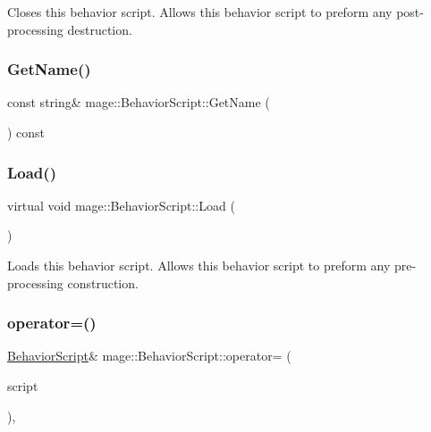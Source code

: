 Closes this behavior script. Allows this behavior script to preform any post-\/processing destruction. \hypertarget{classmage_1_1_behavior_script_a06179af26e24991b5083a5b1d603bc93}{}\label{classmage_1_1_behavior_script_a06179af26e24991b5083a5b1d603bc93} 
\subsubsection{\texorpdfstring{Get\+Name()}{GetName()}}
{\footnotesize\ttfamily const string\& mage\+::\+Behavior\+Script\+::\+Get\+Name (\begin{DoxyParamCaption}{ }\end{DoxyParamCaption}) const}

\hypertarget{classmage_1_1_behavior_script_a9b2954891ee98dcef926b1db42674ce3}{}\label{classmage_1_1_behavior_script_a9b2954891ee98dcef926b1db42674ce3} 
\subsubsection{\texorpdfstring{Load()}{Load()}}
{\footnotesize\ttfamily virtual void mage\+::\+Behavior\+Script\+::\+Load (\begin{DoxyParamCaption}{ }\end{DoxyParamCaption})\hspace{0.3cm}{\ttfamily [virtual]}}

Loads this behavior script. Allows this behavior script to preform any pre-\/processing construction. \hypertarget{classmage_1_1_behavior_script_a0b3327ebf7009e668a7022d254cb1d51}{}\label{classmage_1_1_behavior_script_a0b3327ebf7009e668a7022d254cb1d51} 
\subsubsection{\texorpdfstring{operator=()}{operator=()}}
{\footnotesize\ttfamily \hyperlink{classmage_1_1_behavior_script}{Behavior\+Script}\& mage\+::\+Behavior\+Script\+::operator= (\begin{DoxyParamCaption}\item[{const \hyperlink{classmage_1_1_behavior_script}{Behavior\+Script} \&}]{script }\end{DoxyParamCaption})\hspace{0.3cm}{\ttfamily [private]}, {\ttfamily [delete]}}

